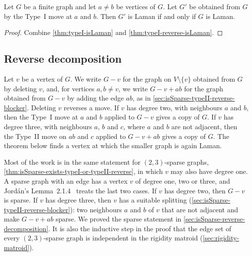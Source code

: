 \begin{theorem}
  \label{thm:typeI-isLaman-iff}
  \leanok
  Let $G$ be a finite graph and let $a \ne b$ be vertices of $G$. Let
  $G'$ be obtained from $G$ by the Type~I move at $a$ and $b$. Then
  $G'$ is Laman if and only if $G$ is Laman.
\end{theorem}
\begin{proof}
  \leanok
  Combine \cref{thm:typeI-isLaman} and
  \cref{thm:typeI-reverse-isLaman}.
\end{proof}

\subsection{Reverse decomposition}
\label{sec:henneberg-decomp}

Let $v$ be a vertex of $G$. We write $G - v$ for the graph on
$V \setminus \{v\}$ obtained from $G$ by deleting $v$, and, for
vertices $a, b \ne v$, we write $G - v + ab$ for the graph obtained
from $G - v$ by adding the edge $ab$, as in
\cref{sec:isSparse-typeII-reverse-blocker}. Deleting $v$ reverses a
move. If $v$ has degree two, with neighbours $a$ and $b$, then the
Type~I move at $a$ and $b$ applied to $G - v$ gives a copy of $G$. If
$v$ has degree three, with neighbours $a$, $b$ and $c$, where $a$ and
$b$ are not adjacent, then the Type~II move on $ab$ and $c$ applied to
$G - v + ab$ gives a copy of $G$. The theorem below finds a vertex at
which the smaller graph is again Laman.

Most of the work is in the same statement for $(2,3)$-sparse graphs,
\cref{thm:isSparse-exists-typeI-or-typeII-reverse}, in which $v$ may
also have degree one. A sparse graph with an edge has a vertex $v$ of
degree one, two or three, and Jord\'an's Lemma~2.1.4~\cite{jordan2016}
treats the last two cases. If $v$ has degree two, then $G - v$ is
sparse. If $v$ has degree three, then $v$ has a suitable splitting
(\cref{sec:isSparse-typeII-reverse-blocker}): two neighbours $a$ and
$b$ of $v$ that are not adjacent and make $G - v + ab$ sparse. We
proved the sparse statement in
\cref{sec:isSparse-reverse-decomposition}. It is also the inductive
step in the proof that the edge set of every $(2,3)$-sparse graph is
independent in the rigidity matroid (\cref{sec:rigidity-matroid}).

